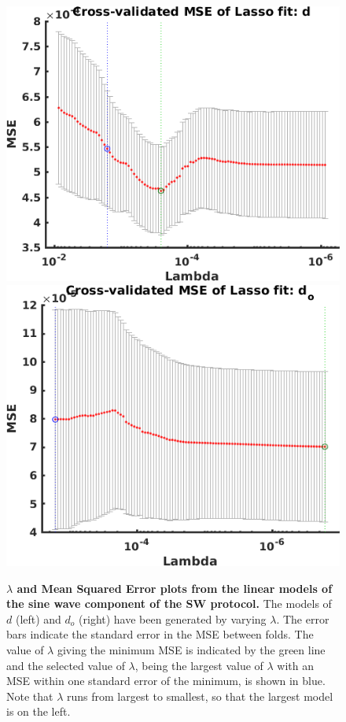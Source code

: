 \documentclass[11pt,a4paper,oneside]{article}
\begin{document}
\begin{figure}[hb]
\begin{center}
\includegraphics[scale=0.42]{Figures/LASSO_SW_AP_core_lambda_d.png}
\includegraphics[scale=0.42]{Figures/LASSO_SW_AP_core_lambda_od.png}
\caption{\textbf{$\lambda$ and Mean Squared Error plots from the linear models of the sine wave component of the SW protocol.} The models of $d$ (left) and $d_o$ (right) have been generated by varying $\lambda$. The error bars indicate the standard error in the MSE between folds. The value of $\lambda$ giving the minimum MSE is indicated by the green line and the selected value of $\lambda$, being the largest value of $\lambda$ with an MSE within one standard error of the minimum, is shown in blue. Note that $\lambda$ runs from largest to smallest, so that the largest model is on the left.}
\label{Fig_LASSO_SW_AP_core_lambda}
\end{center}
\end{figure}
\end{document}
